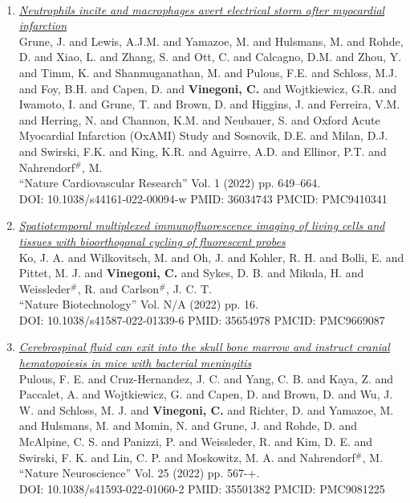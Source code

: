 \documentclass{resume}
\begin{document}
\begin{category}{~~}
\begin{enumerate}
\item \href{https://cvinegoni.github.io/assets/pdf/papers/2022-NCR-2.pdf}{\it  Neutrophils incite and macrophages avert electrical storm after myocardial infarction}\\ Grune, J. and Lewis, A.J.M. and Yamazoe, M. and Hulsmans, M. and Rohde, D. and Xiao, L. and Zhang, S. and Ott, C. and Calcagno, D.M. and Zhou, Y. and Timm, K. and Shanmuganathan, M. and Pulous, F.E. and Schloss, M.J. and Foy, B.H. and Capen, D. and {\bf Vinegoni, C.} and Wojtkiewicz, G.R. and Iwamoto, I. and Grune, T. and Brown, D. and Higgins, J. and Ferreira, V.M. and Herring, N. and Channon, K.M. and Neubauer, S. and Oxford Acute Myocardial Infarction (OxAMI) Study and Sosnovik, D.E. and Milan, D.J. and Swirski, F.K. and King, K.R. and Aguirre, A.D. and Ellinor, P.T. and Nahrendorf$^\#$, M. \\ ``Nature Cardiovascular Research'' Vol. 1 (2022) pp. 649–664. \\ DOI: 10.1038/s44161-022-00094-w PMID: 36034743 PMCID: PMC9410341

\item \href{https://cvinegoni.github.io/assets/pdf/papers/2022-NB.pdf}{\it  Spatiotemporal multiplexed immunofluorescence imaging of living cells and tissues with bioorthogonal cycling of fluorescent probes} \\ Ko, J. A. and Wilkovitsch, M. and Oh, J. and Kohler, R. H. and Bolli, E. and Pittet, M. J. and {\bf Vinegoni, C.} and Sykes, D. B. and Mikula, H. and Weissleder$^\#$, R. and Carlson$^\#$, J. C. T. \\ ``Nature Biotechnology'' Vol. N/A (2022) pp. 16. \\ DOI: 10.1038/s41587-022-01339-6 PMID: 35654978 PMCID: PMC9669087 

\item \href{https://cvinegoni.github.io/assets/pdf/papers/2022-NN.PDF}{\it  Cerebrospinal fluid can exit into the skull bone marrow and instruct cranial hematopoiesis in mice with bacterial meningitis} \\ Pulous, F. E. and Cruz-Hernandez, J. C. and Yang, C. B. and Kaya, Z. and Paccalet, A. and Wojtkiewicz, G. and Capen, D. and Brown, D. and Wu, J. W. and Schloss, M. J. and {\bf Vinegoni, C.} and Richter, D. and Yamazoe, M. and Hulsmans, M. and Momin, N. and Grune, J. and Rohde, D. and McAlpine, C. S. and Panizzi, P. and Weissleder, R. and Kim, D. E. and Swirski, F. K. and Lin, C. P. and Moskowitz, M. A. and Nahrendorf$^\#$, M. \\ ``Nature Neuroscience'' Vol. 25 (2022) pp. 567-+. \\ DOI: 10.1038/s41593-022-01060-2 PMID: 35501382 PMCID: PMC9081225


\end{enumerate}
\end{category}
\end{document}
